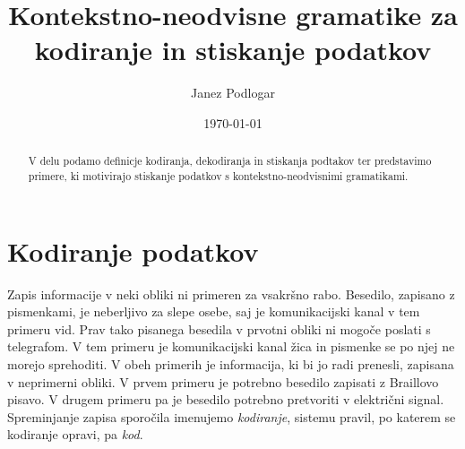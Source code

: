 \documentclass{amsart}
\title{Kontekstno-neodvisne gramatike za kodiranje in stiskanje podatkov}
\author{Janez Podlogar}
\date{\today}
\theoremstyle{definition}
\theoremstyle{plain} %
\begin{document}
\begin{abstract}

    V delu podamo definicje kodiranja, dekodiranja in stiskanja podtakov ter predstavimo
    primere, ki motivirajo stiskanje podatkov s kontekstno-neodvisnimi gramatikami.

\end{abstract}

\maketitle

\section{Kodiranje podatkov}

Zapis informacije v neki obliki ni primeren za vsakršno rabo. Besedilo, zapisano z 
pismenkami, je neberljivo za slepe osebe, saj je komunikacijski kanal v tem primeru
vid. Prav tako pisanega besedila v prvotni obliki ni mogoče poslati s telegrafom. V tem
primeru je komunikacijski kanal žica in pismenke se po njej ne morejo sprehoditi. V obeh 
primerih je informacija, ki bi jo radi prenesli, zapisana v neprimerni obliki. V prvem 
primeru je potrebno besedilo zapisati z Braillovo pisavo. V drugem primeru pa je
besedilo potrebno pretvoriti v električni signal. Spreminjanje zapisa sporočila
imenujemo \textit{kodiranje}, sistemu pravil, po katerem se kodiranje opravi,
pa \textit{kod}.
\end{document}
